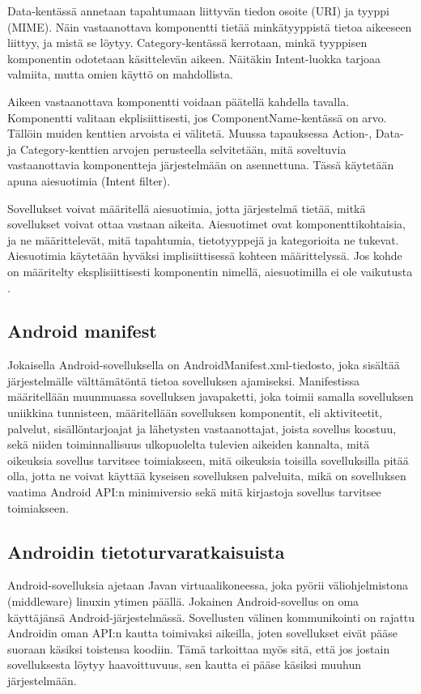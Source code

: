Data-kentässä annetaan tapahtumaan liittyvän tiedon osoite (URI) ja tyyppi (MIME). Näin vastaanottava komponentti tietää minkätyyppistä tietoa aikeeseen liittyy, ja mistä se löytyy. Category-kentässä kerrotaan, minkä tyyppisen komponentin odotetaan käsittelevän aikeen. Näitäkin Intent-luokka tarjoaa valmiita, mutta omien käyttö on mahdollista.

Aikeen vastaanottava komponentti voidaan päätellä kahdella tavalla. Komponentti valitaan ekplisiittisesti, jos ComponentName-kentässä on arvo. Tällöin muiden kenttien arvoista ei välitetä. Muussa tapauksessa Action-, Data- ja Category-kenttien arvojen perusteella selvitetään, mitä soveltuvia vastaanottavia komponentteja järjestelmään on asennettuna. Tässä käytetään apuna aiesuotimia (Intent filter).

Sovellukset voivat määritellä aiesuotimia, jotta järjestelmä tietää, mitkä sovellukset voivat ottaa vastaan aikeita. Aiesuotimet ovat komponenttikohtaisia, ja ne määrittelevät, mitä tapahtumia, tietotyyppejä ja kategorioita ne tukevat. Aiesuotimia käytetään hyväksi implisiittisessä kohteen määrittelyssä. Jos kohde on määritelty eksplisiittisesti komponentin nimellä, aiesuotimilla ei ole vaikutusta \cite{android}.

\subsection{Android manifest}

Jokaisella Android-sovelluksella on AndroidManifest.xml-tiedosto, joka sisältää järjestelmälle välttämätöntä tietoa sovelluksen ajamiseksi. Manifestissa määritellään muunmuassa sovelluksen javapaketti, joka toimii samalla sovelluksen uniikkina tunnisteen, määritellään sovelluksen komponentit, eli aktiviteetit, palvelut, sisällöntarjoajat ja lähetysten vastaanottajat, joista sovellus koostuu, sekä niiden toiminnallisuus ulkopuolelta tulevien aikeiden kannalta, mitä oikeuksia sovellus tarvitsee toimiakseen, mitä oikeuksia toisilla sovelluksilla pitää olla, jotta ne voivat käyttää kyseisen sovelluksen palveluita, mikä on sovelluksen vaatima Android API:n minimiversio sekä mitä kirjastoja sovellus tarvitsee toimiakseen. \cite{android}

\subsection{Androidin tietoturvaratkaisuista}

Android-sovelluksia ajetaan Javan virtuaalikoneessa, joka pyörii väliohjelmistona (middleware) linuxin ytimen päällä. Jokainen Android-sovellus on oma käyttäjänsä Android-järjestelmässä. Sovellusten välinen kommunikointi on rajattu Androidin oman API:n kautta toimivaksi aikeilla, joten sovellukset eivät pääse suoraan käsiksi toistensa koodiin. Tämä tarkoittaa myös sitä, että jos jostain sovelluksesta löytyy haavoittuvuus, sen kautta ei pääse käsiksi muuhun järjestelmään.

